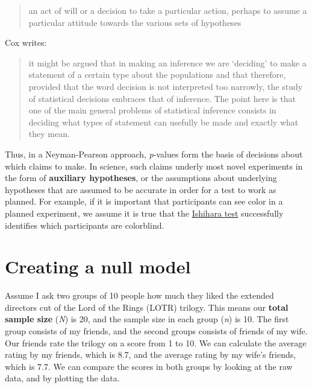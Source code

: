 \documentclass[
  oneside]{book}
\begin{document}
\begin{quote}
an act of will or a decision to take a particular action, perhaps to assume a particular attitude towards the various sets of hypotheses
\end{quote}

Cox \citeyearpar{cox_problems_1958} writes:

\begin{quote}
it might be argued that in making an inference we are `deciding' to make a statement of a certain type about the populations and that therefore, provided that the word decision is not interpreted too narrowly, the study of statistical decisions embraces that of inference. The point here is that one of the main general problems of statistical inference consists in deciding what types of statement can usefully be made and exactly what they mean.
\end{quote}

Thus, in a Neyman-Pearson approach, \emph{p}-values form the basis of decisions about which claims to make. In science, such claims underly most novel experiments in the form of \textbf{auxiliary hypotheses}, or the assumptions about underlying hypotheses that are assumed to be accurate in order for a test to work as planned. For example, if it is important that participants can see color in a planned experiment, we assume it is true that the \href{https://en.wikipedia.org/wiki/Ishihara_test}{Ishihara test} successfully identifies which participants are colorblind.

\hypertarget{creating-a-null-model}{%
\section{Creating a null model}\label{creating-a-null-model}}

Assume I ask two groups of 10 people how much they liked the extended directors cut of the Lord of the Rings (LOTR) trilogy. This means our \textbf{total sample size} (\emph{N}) is 20, and the sample size in each group (\emph{n}) is 10. The first group consists of my friends, and the second groups consists of friends of my wife. Our friends rate the trilogy on a score from 1 to 10. We can calculate the average rating by my friends, which is 8.7, and the average rating by my wife's friends, which is 7.7. We can compare the scores in both groups by looking at the raw data, and by plotting the data.
\end{document}
